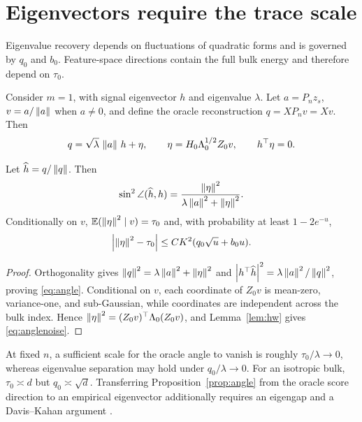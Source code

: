 \section{Eigenvectors require the trace scale}\label{sec:eigenvectors}
Eigenvalue recovery depends on fluctuations of quadratic forms and is governed by $q_0$ and $b_0$.  Feature-space directions contain the full bulk energy and therefore depend on $\tau_0$.

Consider $m=1$, with signal eigenvector $h$ and eigenvalue $\lambda$.  Let $a=P_nz_s$, $v=a/\left\lVert a\right\rVert$ when $a\ne0$, and define the oracle reconstruction $q=XP_nv=Xv$.  Then
\begin{equation}
q=\sqrt\lambda\,\left\lVert a\right\rVert\,h+\eta,
\qquad \eta=H_0\Lambda_0^{1/2}Z_0v,
\qquad h^\top\eta=0.
\end{equation}
\begin{proposition}\label{prop:angle}
Let $\widehat{h}=q/\left\lVert q\right\rVert$.  Then
\begin{equation}\label{eq:angle}
\sin^2\angle(\widehat{h},h)=\frac{\left\lVert\eta\right\rVert^2}{\lambda\left\lVert a\right\rVert^2+\left\lVert\eta\right\rVert^2}.
\end{equation}
Conditionally on $v$, $\mathbb{E}(\left\lVert\eta\right\rVert^2\mid v)=\tau_0$ and, with probability at least $1-2e^{-u}$,
\begin{equation}\label{eq:anglenoise}
\left\lvert\left\lVert\eta\right\rVert^2-\tau_0\right\rvert\le CK^2(q_0\sqrt u+b_0u).
\end{equation}
\end{proposition}
\begin{proof}
Orthogonality gives $\left\lVert q\right\rVert^2=\lambda\left\lVert a\right\rVert^2+\left\lVert\eta\right\rVert^2$ and $\left\lvert h^\top\widehat{h}\right\rvert^2=\lambda\left\lVert a\right\rVert^2/\left\lVert q\right\rVert^2$, proving \eqref{eq:angle}.  Conditional on $v$, each coordinate of $Z_0v$ is mean-zero, variance-one, and sub-Gaussian, while coordinates are independent across the bulk index.  Hence $\left\lVert\eta\right\rVert^2=(Z_0v)^\top\Lambda_0(Z_0v)$, and Lemma~\ref{lem:hw} gives \eqref{eq:anglenoise}.
\end{proof}

At fixed $n$, a sufficient scale for the oracle angle to vanish is roughly $\tau_0/\lambda\to0$, whereas eigenvalue separation may hold under $q_0/\lambda\to0$.  For an isotropic bulk, $\tau_0\asymp d$ but $q_0\asymp\sqrt d$.  Transferring Proposition~\ref{prop:angle} from the oracle score direction to an empirical eigenvector additionally requires an eigengap and a Davis--Kahan argument \citep{DavisKahan1970,YuWangSamworth2015}.
